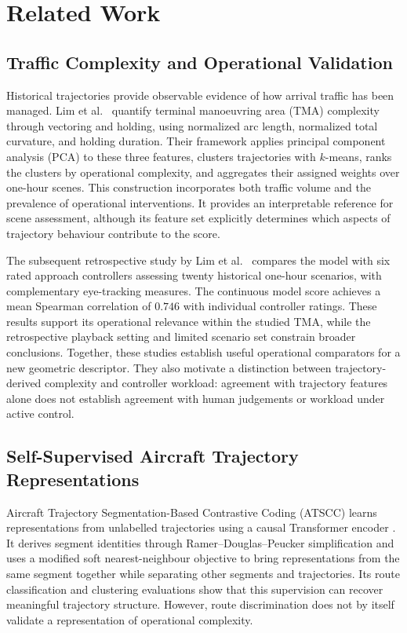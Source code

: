 \section{Related Work}
\label{sec:related-work}

\subsection{Traffic Complexity and Operational Validation}
\label{sec:rw-complexity}
Historical trajectories provide observable evidence of how arrival traffic
has been managed. Lim et al.~\cite{lim2024datadriven} quantify terminal manoeuvring
area (TMA) complexity through vectoring and holding, using normalized arc
length, normalized total curvature, and holding duration. Their framework
applies principal component analysis (PCA) to these three features,
clusters trajectories with $k$-means, ranks the clusters by operational
complexity, and aggregates their assigned weights over one-hour scenes.
This construction incorporates both traffic volume and the prevalence of
operational interventions. It provides an interpretable reference for
scene assessment, although its feature set explicitly determines which
aspects of trajectory behaviour contribute to the score.

The subsequent retrospective study by Lim et al.~\cite{lim2026retrospective}
compares the model with six rated approach controllers assessing twenty
historical one-hour scenarios, with complementary eye-tracking measures.
The continuous model score achieves a mean Spearman correlation of
$0.746$ with individual controller ratings. These results support its
operational relevance within the studied TMA, while the retrospective
playback setting and limited scenario set constrain broader conclusions.
Together, these studies establish useful operational comparators for a
new geometric descriptor. They also motivate a distinction between
trajectory-derived complexity and controller workload: agreement with
trajectory features alone does not establish agreement with human
judgements or workload under active control.

\subsection{Self-Supervised Aircraft Trajectory Representations}
\label{sec:rw-representation}
Aircraft Trajectory Segmentation-Based Contrastive Coding (ATSCC)
learns representations from unlabelled trajectories using a causal
Transformer encoder \cite{phisannupawong2025atscc}. It derives segment
identities through Ramer--Douglas--Peucker simplification and uses a
modified soft nearest-neighbour objective to bring representations from
the same segment together while separating other segments and
trajectories. Its route classification and clustering evaluations show
that this supervision can recover meaningful trajectory structure.
However, route discrimination does not by itself validate a
representation of operational complexity.

